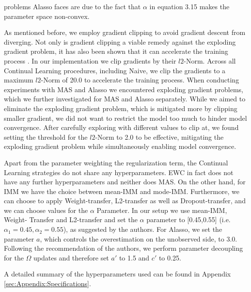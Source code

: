 problems Alasso faces are due to the fact that $\alpha$ in equation 3.15 makes the parameter space non-convex. \par
As mentioned before, we employ gradient clipping to avoid gradient descent from diverging. Not only is gradient clipping a viable remedy against the exploding
gradient problem, it has also been shown that it can accelerate the training process \cite{zhang2019gradient}. In our implementation we clip gradients by their
$l2$-Norm. Across all Continual Learning procedures, including Naive, we clip the gradients to a maximum $l2$-Norm of 20.0 to accelerate the training process.
When conducting experiments with MAS and Alasso we encountered exploding gradient problems, which we further investigated for MAS and Alasso separately. While we
aimed to eliminate the exploding gradient problem, which is mitigated more by clipping smaller gradient, we did not want to restrict the model too much to hinder 
model convergence. After carefully exploring with different values to clip at, we found setting the threshold for the $l2$-Norm to 2.0 to be effective, mitigating
the exploding gradient problem while simultaneously enabling model convergence. \par
Apart from the parameter weighting the regularization term, the Continual Learning strategies do not share any hyperparameters. EWC in fact does not have
any further hyperparameters and neither does MAS. On the other hand, for IMM we have the choice between mean-IMM and mode-IMM. Furthermore, we can choose
to apply Weight-transfer, L2-transfer as well as Dropout-transfer, and we can choose values for the $\alpha$ Parameter. In our setup we use mean-IMM, Weight-
Transfer and L2-transfer and set the $\alpha$ parameter to [0.45,0.55] (i.e. $\alpha_1 = 0.45, \alpha_2 = 0.55$), as suggested by the authors. For Alasso, we set
the parameter $a$, which controls the overestimation on the unobserved side, to 3.0. Following the recommendation of the authors, we perform parameter decoupling
for the $\Omega$ updates and therefore set $a'$ to 1.5 and $c'$ to 0.25. \par
A detailed summary of the hyperparameters used can be found in Appendix \ref{sec:Appendix:Specifications}.


